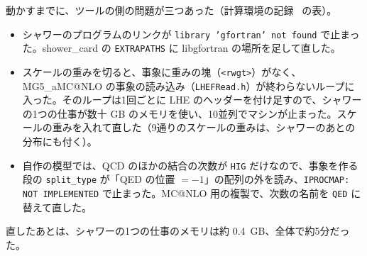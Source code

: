 \documentclass[a4paper,10pt]{ltjsarticle}
\makeatletter
\newcommand{\MGaMC}{MG5\_aMC@NLO}
\makeatother
\begin{document}
動かすまでに、ツールの側の問題が三つあった（計算環境の記録~\cite{env} の表）。
\begin{itemize}
\item シャワーのプログラムのリンクが \texttt{library 'gfortran' not found} で止まった。shower\_card の \texttt{EXTRAPATHS} に libgfortran の場所を足して直した。
\item スケールの重みを切ると、事象に重みの塊（\texttt{<rwgt>}）がなく、\MGaMC{} の事象の読み込み（\texttt{LHEFRead.h}）が終わらないループに入った。そのループは1回ごとに LHE のヘッダーを付け足すので、シャワーの1つの仕事が数十 GB のメモリを使い、10並列でマシンが止まった。スケールの重みを入れて直した（9通りのスケールの重みは、シャワーのあとの分布にも付く）。
\item 自作の模型では、QCD のほかの結合の次数が \texttt{HIG} だけなので、事象を作る段の \texttt{split\_type} が「QED の位置 $=-1$」の配列の外を読み、\texttt{IPROCMAP: NOT IMPLEMENTED} で止まった。MC@NLO 用の複製で、次数の名前を \texttt{QED} に替えて直した。
\end{itemize}
直したあとは、シャワーの1つの仕事のメモリは約 0.4~GB、全体で約5分だった。
\end{document}

